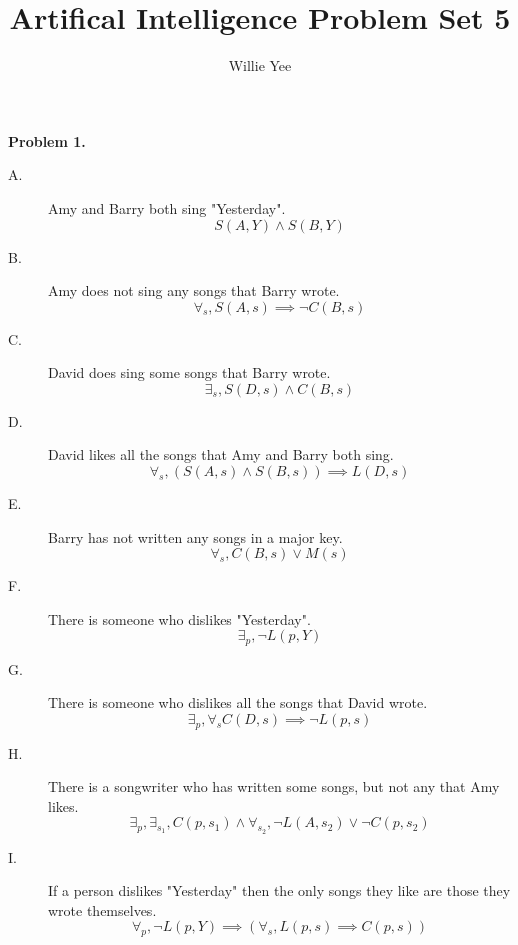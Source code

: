 \documentclass{article}
\begin{document}
\title{Artifical Intelligence Problem Set 5}
\date{}
\author{Willie Yee}
\maketitle
\noindent
\textbf{Problem 1.}
\begin{description}
	\item [A.] Amy and Barry both sing "Yesterday". $$S(A,Y)\wedge S(B,Y)$$
	\item [B.] Amy does not sing any songs that Barry wrote. $$\forall_s, S(A,s)\implies\neg C(B,s)$$
	\item [C.] David does sing some songs that Barry wrote. $$\exists_s, S(D,s)\wedge C(B,s)$$
	\item [D.] David likes all the songs that Amy and Barry both sing. $$\forall_s, (S(A,s)\wedge S(B,s))\implies L(D,s)$$
	\item [E.] Barry has not written any songs in a major key. $$\forall_s, C(B,s)\vee M(s)$$
	\item [F.] There is someone who dislikes "Yesterday". $$\exists_p, \neg L(p,Y)$$
	\item [G.] There is someone who dislikes all the songs that David wrote. $$\exists_p,\forall_s C(D,s)\implies\neg L(p,s)$$
	\item [H.] There is a songwriter who has written some songs, but not any that Amy likes. $$\exists_p, \exists_{s_1}, C(p,s_1)\wedge\forall_{s_2},\neg L(A,s_2)\vee\neg C(p,s_2)$$
	\item [I.] If a person dislikes "Yesterday" then the only songs they like are those they wrote themselves. $$\forall_p, \neg L(p,Y)\implies (\forall_s, L(p,s)\implies C(p,s))$$
\end{description}
\end{document}
